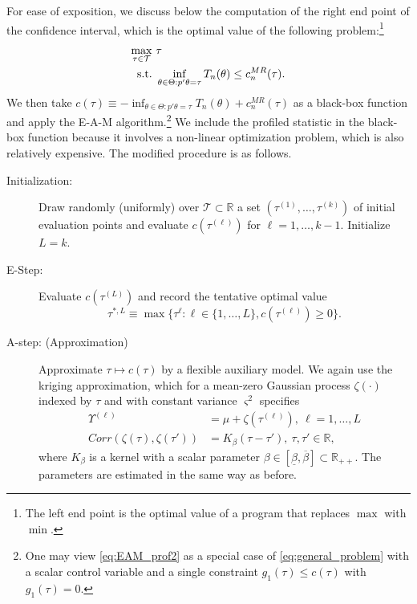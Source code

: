 \documentclass[letterpaper,11pt]{article}
\theoremstyle{myplain}
\theoremstyle{mydefinition}
\theoremstyle{myremark}
\newcommand{\R}{\mathbb{R}}
\newcommand{\cT}{\mathcal{T}}
\numberwithin{equation}{section}
\numberwithin{figure}{section}
\begin{document}
\begin{appendix}
For ease of exposition, we discuss below the computation of the right end point of the confidence interval, which is the optimal value of the following problem:\footnote{The left end point is the optimal value of a program that replaces $\max$ with $\min$.}
\begin{align}
\max_{\tau\in\cT}& ~\tau \label{eq:EAM_prof2}\\
\text{s.t.} &~\inf_{\theta\in\Theta:p'\theta=\tau}T_n(\theta)\le c^{MR}_n(\tau).\notag
\end{align}
We then take $c(\tau)\equiv -\inf_{\theta\in\Theta:p'\theta=\tau}T_n(\theta)+c^{MR}_n(\tau)$ as a black-box function and apply the E-A-M algorithm.\footnote{One may view \eqref{eq:EAM_prof2} as a special case of \eqref{eq:general_problem} with a scalar control variable and  a single constraint $g_1(\tau)\le c(\tau)$ with $g_1(\tau)=0$.} We include the profiled statistic in the black-box function because it involves a non-linear optimization problem, which is also relatively expensive.
The modified procedure is as follows. 
\begin{description}
\item[Initialization:]Draw randomly (uniformly) over $\cT\subset\mathbb R$ a set $(\tau^{(1)},\dots,\tau^{(k)})$ of initial evaluation points and evaluate $c(\tau^{(\ell)})$ for $\ell=1,\dots,k-1$. Initialize $L=k$.
\item[E-Step:]Evaluate $c(\tau^{(L)})$ and record the tentative optimal value
\begin{equation*}
\tau^{*,L}\equiv\max\bigl\{\tau^{\ell}:\ell\in\{1,\dots,L\},c(\tau^{(\ell)})\ge 0\bigr\}.
\end{equation*}
	\item[A-step: (Approximation)] Approximate $\tau\mapsto c(\tau)$ by a flexible auxiliary model. We again use the kriging approximation, which for a mean-zero Gaussian process $\zeta(\cdot)$ indexed by $\tau$ and with constant variance $\varsigma^2$ specifies
	\begin{align}
		\Upsilon^{(\ell)}&=\mu+\zeta(\tau^{(\ell)}), ~\ell=1,\dots, L\label{eq:EAM:gauss_prior_prof}\\
		Corr(\zeta(\tau),\zeta(\tau'))&=K_\beta(\tau-\tau'),~ \tau,\tau' \in \mathbb R\label{eq:EAM:corr_prof},
	\end{align}
	where $K_\beta$ is a kernel with a scalar parameter $\beta \in [\underline{\beta},\overline{\beta}]\subset \R_{++}$. The parameters are estimated in the same way as before.


\end{description}
\end{appendix}
\end{document}
